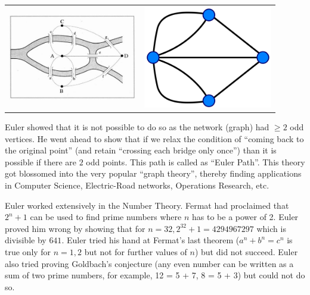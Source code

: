 \documentclass[12pt]{article}
\begin{document}
\begin{tabular}{  p{0.45\linewidth}  p{0.45\linewidth} }
\includegraphics[width=0.8\linewidth]{images/bridges}
&
\includegraphics[width=0.6\linewidth]{images/graph}
\\
\end{tabular}

Euler showed that it is not possible to do so as the network (graph) had $\ge 2$ odd vertices. He went ahead to show that if we relax the condition of  ``coming back to the original point'' (and retain ``crossing each bridge only once'') than it is possible if there are $2$ odd points. This path is called as ``Euler Path''. This theory got blossomed into the very popular ``graph theory'', thereby finding applications in Computer Science, Electric-Road networks, Operations Research, etc.

Euler worked extensively in the Number Theory. Fermat had proclaimed that $2^n + 1$ can be used to find prime numbers where $n$ has to be a power of 2. Euler proved him wrong by showing that for $n=32, 2^{32}+1 = 4294967297$ which is divisible by $641$.  Euler tried his hand at Fermat's last theorem ($a^n + b^n = c^n$ is true only for $n=1,2$ but not for further values of $n$) but did not succeed. Euler also tried proving Goldbach's conjecture (any even number can be written as a  sum of two prime numbers, for example, 12 = 5 + 7, 8 = 5 + 3) but could not do so.
\end{document}
